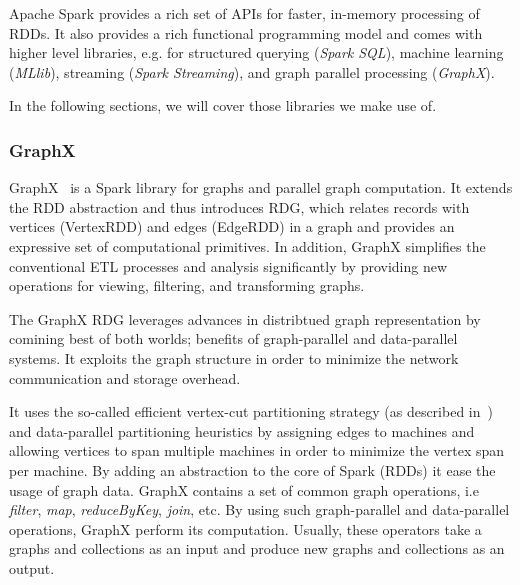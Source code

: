 Apache Spark provides a rich set of APIs for faster, in-memory processing of \gls{RDD}s.
It also provides a rich functional programming model and comes with higher level libraries, e.g. for structured querying (\textit{Spark SQL}), machine learning (\textit{MLlib}), streaming (\textit{Spark Streaming}), and graph parallel processing (\textit{GraphX}).

In the following sections, we will cover those libraries we make use of.

\subsubsection{GraphX}
GraphX~\cite{Gonzalez2014GraphX} is a Spark library for graphs and parallel graph computation.
It extends the \gls{RDD} abstraction and thus introduces \gls{RDG}, which relates records with vertices (VertexRDD) and edges (EdgeRDD) in a graph and provides an expressive set of computational primitives.
In addition, GraphX simplifies the conventional ETL processes and analysis significantly by providing new operations for viewing, filtering, and transforming graphs.

The GraphX \gls{RDG} leverages advances in distribtued graph representation by comining best of both worlds; benefits of graph-parallel and data-parallel systems.
It exploits the graph structure in order to minimize the network communication and storage overhead.

It uses the so-called efficient vertex-cut partitioning strategy (as described in~\cite{Gonzalez2012PowerGraph}) and data-parallel partitioning heuristics by assigning edges to machines and allowing vertices to span multiple machines in order to minimize the vertex span per machine.
By adding an abstraction to the core of Spark (\gls{RDD}s) it ease the usage of graph data.
GraphX contains a set of common graph operations, i.e \textit{filter}, \textit{map}, \textit{reduceByKey}, \textit{join}, etc.
By using such graph-parallel and data-parallel operations, GraphX perform its computation.
Usually, these operators take a graphs and collections as an input and produce new graphs and collections as an output.


